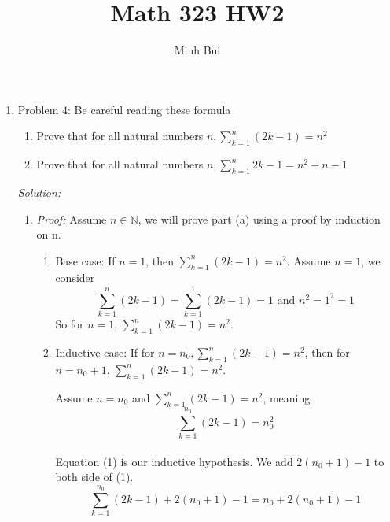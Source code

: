 \documentclass{article}
\author{Minh Bui}
\title{Math 323 HW2}
\begin{document}
\maketitle
\begin{enumerate}
    \item Problem 4: Be careful reading these formula
        \begin{enumerate}
            \item Prove that for all natural numbers $n,
                \sum_{k=1}^n (2k - 1) = n^2$ 
            \item Prove that for all natural numbers $n,
                \sum_{k=1}^n 2k - 1 = n^2 + n - 1$
        \end{enumerate}
    \emph{Solution:}
        \begin{enumerate}
            \item \emph{Proof:} Assume $n \in \mathbb{N}$, 
                we will prove part (a) using a proof by induction on n.
                \begin{enumerate}
                    \item Base case: If $n = 1$, then $\sum_{k=1}^n (2k - 1) = n^2.$
                        Assume $n = 1$, we consider
                        \begin{equation*}
                            \sum_{k=1}^n (2k - 1) = \sum_{k=1}^1 (2k - 1) = 1 \text{ and }
                            n^2 = 1^2 = 1
                        \end{equation*}
                        So for $n = 1$, $\sum_{k=1}^n (2k - 1) = n^2$.
                    \item Inductive case: If for $n = n_{0}, \sum_{k=1}^n (2k - 1) = n^2$, 
                        then for $n = n_{0} + 1$, $\sum_{k=1}^n (2k - 1) = n^2.$

                        Assume $n = n_{0}$ and $\sum_{k=1}^n (2k - 1) = n^2$, meaning
                        \begin{equation}
                            \sum_{k=1}^{n_{0}} (2k - 1) = n_{0}^2
                        \end{equation}
                        \\
                        Equation (1) is our inductive hypothesis. We add $2(n_{0} + 1) - 1$ to both side of (1).
                        \begin{equation*}
                        \sum_{k=1}^{n_{0}} (2k - 1) + 2(n_{0} + 1) - 1 = n_{0} + 2(n_{0} + 1) - 1
                        \end{equation*}


\end{enumerate}
\end{enumerate}
\end{enumerate}
\end{document}
